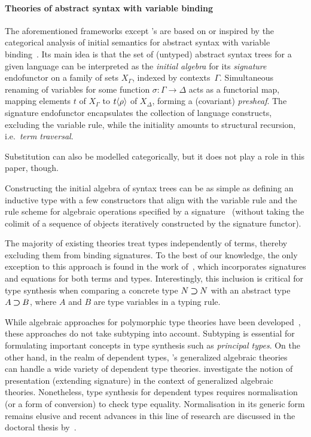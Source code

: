 \paragraph{Theories of abstract syntax with variable binding}
The aforementioned frameworks except \citeauthor{Gheri2020}'s are based on or inspired by the categorical analysis of initial semantics for abstract syntax with variable binding~\cite{Fiore1999}.
Its main idea is that the set of (untyped) abstract syntax trees for a given language can be interpreted as the \emph{initial algebra} for its \emph{signature} endofunctor on a family of sets $X_{\Gamma}$, indexed by contexts~$\Gamma$.
Simultaneous renaming of variables for some function $\sigma\colon \Gamma \to \Delta$ acts as a functorial map, mapping elements $t$ of $X_{\Gamma}$ to ${t}\!\left<{\rho}\right>$ of $X_{\Delta}$, forming a (covariant) \emph{presheaf}.
The signature endofunctor encapsulates the collection of language constructs, excluding the variable rule, while the initiality amounts to structural recursion, i.e.\ \emph{term traversal}.

Substitution can also be modelled categorically, but it does not play a role in this paper, though.

\begin{remark}
Constructing the initial algebra of syntax trees can be as simple as defining an inductive type with a few constructors that align with the variable rule and the rule scheme for algebraic operations specified by a signature~\citep{Allais2021,Fiore2022} (without taking the colimit of a sequence of objects iteratively constructed by the signature functor).
\end{remark}

\begin{remark} \label{re:type-signature}
The majority of existing theories treat types independently of terms, thereby excluding them from binding signatures.
To the best of our knowledge, the only exception to this approach is found in the work of~\citet{Arkor2020}, which incorporates signatures and equations for both terms and types.
Interestingly, this inclusion is critical for type synthesis when comparing a concrete type $N \mathbin{\bm{\supset}} N$ with an abstract type $A \mathbin{\bm{\supset}} B$, where $A$ and $B$ are type variables in a typing rule.
\end{remark}

While algebraic approaches for polymorphic type theories have been developed~\citep{Fiore2013,Hamana2011}, these approaches do not take subtyping into account.
Subtyping is essential for formulating important concepts in type synthesis such as \emph{principal types}.
On the other hand, in the realm of dependent types, \citeauthor{Cartmell1986}'s generalized algebraic theories~\citeyearpar{Cartmell1986} can handle a wide variety of dependent type theories.
\citet{Bezem2021} investigate the notion of presentation (extending signature) in the context of generalized algebraic theories.
Nonetheless, type synthesis for dependent types requires normalisation (or a form of conversion) to check type equality.
Normalisation in its generic form remains elusive and recent advances in this line of research are discussed in the doctoral thesis by~\citet{Valliappan2023}.

